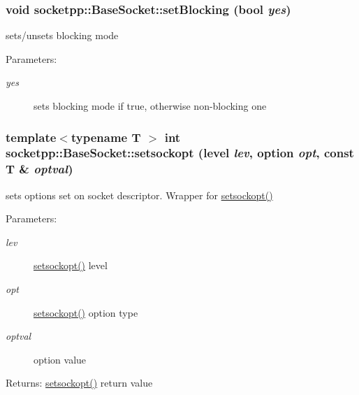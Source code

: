 \begin{CompactItemize}
{\subsubsection[{setBlocking}]{\setlength{\rightskip}{0pt plus 5cm}void socketpp::BaseSocket::setBlocking (bool {\em yes})}}
\label{classsocketpp_1_1BaseSocket_4cffcd5cae4ef51e953495837fade4c3}


sets/unsets blocking mode 

\begin{Desc}
\item[Parameters:]
\begin{description}
\item[{\em yes}]sets blocking mode if true, otherwise non-blocking one \end{description}
\end{Desc}
\hypertarget{classsocketpp_1_1BaseSocket_3f1f168e4953c046bb1159941da2fa30}{
\subsubsection[{setsockopt}]{\setlength{\rightskip}{0pt plus 5cm}template$<$typename T $>$ int socketpp::BaseSocket::setsockopt (level {\em lev}, \/  option {\em opt}, \/  const T \& {\em optval})}}
\label{classsocketpp_1_1BaseSocket_3f1f168e4953c046bb1159941da2fa30}


sets options set on socket descriptor. Wrapper for \hyperlink{classsocketpp_1_1BaseSocket_3f1f168e4953c046bb1159941da2fa30}{setsockopt()} 

\begin{Desc}
\item[Parameters:]
\begin{description}
\item[{\em lev}]\hyperlink{classsocketpp_1_1BaseSocket_3f1f168e4953c046bb1159941da2fa30}{setsockopt()} level \item[{\em opt}]\hyperlink{classsocketpp_1_1BaseSocket_3f1f168e4953c046bb1159941da2fa30}{setsockopt()} option type \item[{\em optval}]option value \end{description}
\end{Desc}
\begin{Desc}
\item[Returns:]\hyperlink{classsocketpp_1_1BaseSocket_3f1f168e4953c046bb1159941da2fa30}{setsockopt()} return value \end{Desc}
\hypertarget{classsocketpp_1_1BaseSocket_0804d148470fd742cda495d3533b25c6}{
}
\end{CompactItemize}

